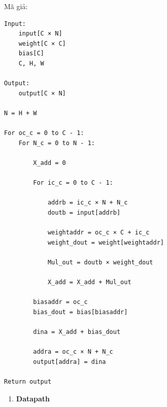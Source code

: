 \documentclass{uetgraduation}
\begin{document}
Mã giả:
\begin{Verbatim}[frame=single]
Input:
    input[C × N]
    weight[C × C]
    bias[C]
    C, H, W

Output:
    output[C × N]

N = H + W

For oc_c = 0 to C - 1:
    For N_c = 0 to N - 1:

        X_add = 0

        For ic_c = 0 to C - 1:

            addrb = ic_c × N + N_c
            doutb = input[addrb]

            weightaddr = oc_c × C + ic_c
            weight_dout = weight[weightaddr]

            Mul_out = doutb × weight_dout

            X_add = X_add + Mul_out

        biasaddr = oc_c
        bias_dout = bias[biasaddr]

        dina = X_add + bias_dout

        addra = oc_c × N + N_c
        output[addra] = dina

Return output
\end{Verbatim}

\begin{enumerate}
    \item \textbf{Datapath}
\end{enumerate}
\end{document}
